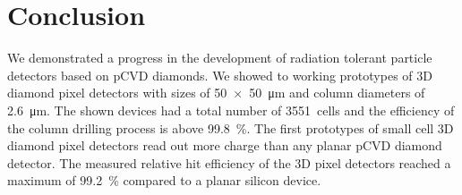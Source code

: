 \section{Conclusion}
We demonstrated a progress in the development of radiation tolerant particle detectors based on \ac{pCVD} diamonds. We showed to working prototypes of 3D diamond pixel detectors with sizes of \SI{50x50}{\um} and column diameters of \SI{2.6}{\um}. The shown devices had a total number of \SI{3551}{cells} and the efficiency of the column drilling process is above \SI{99.8}{\%}. The first prototypes of small cell 3D diamond pixel detectors read out more charge than any planar \ac{pCVD} diamond detector. The measured relative hit efficiency of the 3D pixel detectors reached a maximum of \SI{99.2}{\%} compared to a planar silicon device.\par